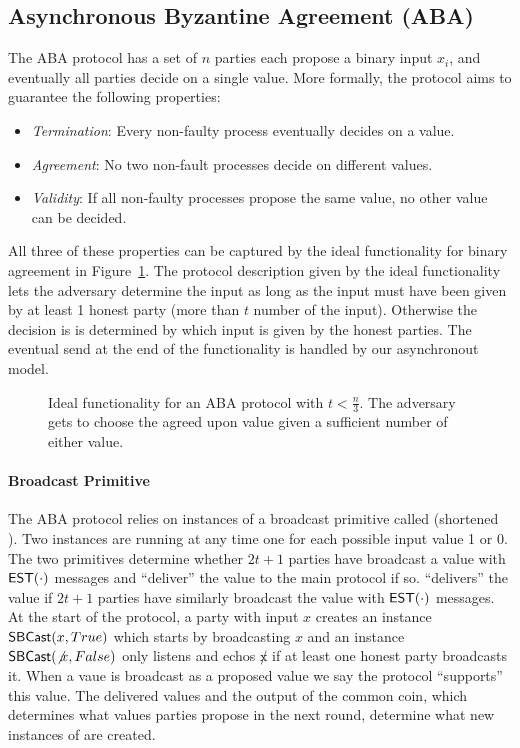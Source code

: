 \subsection{Asynchronous Byzantine Agreement (ABA)}
The ABA protocol has a set of $n$ parties each propose a binary input $x_i$,
and eventually all parties decide on a single value.  More formally, the
protocol aims to guarantee the following properties:
\begin{itemize}
\item \emph{Termination}: Every non-faulty process eventually decides on a
value.
\item \emph{Agreement}: No two non-fault processes decide on different values.
\item \emph{Validity}: If all non-faulty processes propose the same value, no
other value can be decided.
\end{itemize}
All three of these properties can be captured by the ideal functionality for
binary agreement in Figure~\ref{fig:faba}.  The protocol description given by
the ideal functionality lets the adversary determine the input as long as the
input must have been given by at least 1 honest party (more than $t$ number of
the input).  Otherwise the decision is is determined by which input is given by
the honest parties. The eventual send at the end of the functionality is handled
by our asynchronout model. 

\begin{figure}

\caption{Ideal functionality for an ABA protocol with $t < \frac{n}{3}$. The
adversary gets to choose the agreed upon value given a sufficient number of
either value.}
\label{fig:faba}
\end{figure}

\paragraph{Broadcast Primitive}
The ABA protocol relies on instances of a broadcast primitive called
 (shortened ).  Two  instances are
running at any time one for each possible input value 1 or 0.  The two
primitives determine whether $2t+1$ parties have broadcast a value with
${\mathsf {EST}}(\cdot)$ messages and ``deliver'' the value to the main protocol if so.
``delivers'' the value if $2t+1$ parties have similarly broadcast the value
with ${\mathsf {EST}}(\cdot)$ messages.  At the start of the protocol, a party with
input $x$ creates an instance ${\mathsf {SBCast}}(x, True)$ which starts by
broadcasting $x$ and an instance ${\mathsf {SBCast}}(\not x, False)$ only listens and
echos $\not x$ if at least one honest party broadcasts it.  When a vaue is
broadcast as a proposed value we say the protocol ``supports'' this value. The
delivered values and the output of the common coin, which determines what
values parties propose in the next round, determine what new instances of
 are created.

